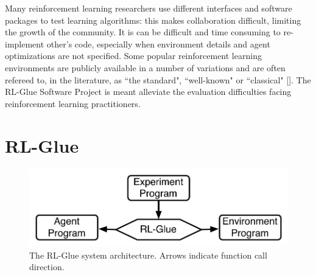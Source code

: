 \documentclass[twopage,11pt]{article}
\begin{document}
 


Many reinforcement learning researchers use different interfaces and software packages to test learning algorithms: this makes collaboration difficult, limiting the growth of the community. It is can be difficult and time consuming to re-implement other's code, especially when environment details and agent optimizations are not specified. Some popular reinforcement learning environments are publicly available in a number of variations and are often refereed to, in the literature, as ``the standard", ``well-known" or ``classical" [\cite{whiteThesis}]. The RL-Glue Software Project is meant alleviate the evaluation difficulties facing reinforcement learning practitioners.




















 



	 

\section{RL-Glue}

\begin{figure}[h]
\begin{center}
\includegraphics[width = 9 cm]{glue.pdf}
\vspace{-0.2cm}
\caption{\small The RL-Glue system architecture. Arrows indicate function call direction.}\label{fig:RLDIA}
\end{center}
\vspace{-0.4cm}
\end{figure}
\end{document}
